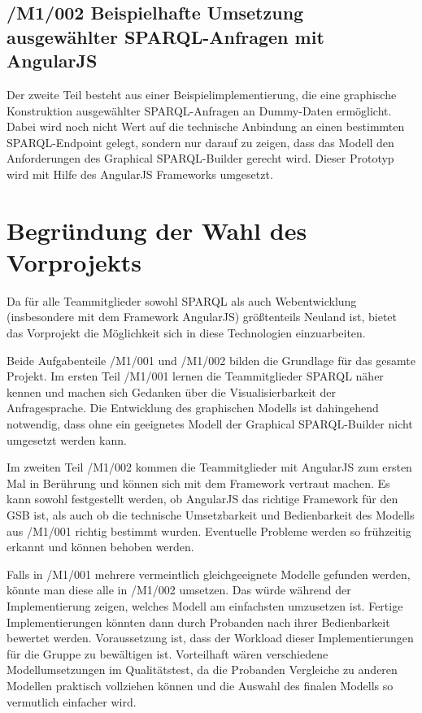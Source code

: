 \subsection*{/M1/002 Beispielhafte Umsetzung ausgewählter SPARQL-Anfragen mit AngularJS}
Der zweite Teil besteht aus einer Beispielimplementierung, die eine graphische Konstruktion ausgewählter SPARQL-Anfragen an Dummy-Daten ermöglicht.
Dabei wird noch nicht Wert auf die technische Anbindung an einen bestimmten SPARQL-Endpoint gelegt, sondern nur darauf zu zeigen, dass das Modell den Anforderungen des Graphical SPARQL-Builder gerecht wird.
Dieser Prototyp wird mit Hilfe des AngularJS Frameworks umgesetzt. 


\section{Begründung der Wahl des Vorprojekts}

Da für alle Teammitglieder sowohl SPARQL als auch Webentwicklung (insbesondere mit dem Framework AngularJS) größtenteils Neuland ist, bietet das Vorprojekt die Möglichkeit sich in diese Technologien einzuarbeiten.

Beide Aufgabenteile /M1/001 und /M1/002 bilden die Grundlage für das gesamte Projekt.
Im ersten Teil /M1/001 lernen die Teammitglieder SPARQL näher kennen und machen sich Gedanken über die Visualisierbarkeit der Anfragesprache. Die Entwicklung des graphischen Modells ist dahingehend notwendig, dass ohne ein geeignetes Modell der Graphical SPARQL-Builder nicht umgesetzt werden kann.

Im zweiten Teil /M1/002 kommen die Teammitglieder mit AngularJS zum ersten Mal in Berührung und können sich mit dem Framework vertraut machen.
Es kann sowohl festgestellt werden, ob AngularJS das richtige Framework für den GSB ist, als auch ob die technische Umsetzbarkeit und Bedienbarkeit des Modells aus /M1/001 richtig bestimmt wurden.
Eventuelle Probleme werden so frühzeitig erkannt und können behoben werden.

Falls in /M1/001 mehrere vermeintlich gleichgeeignete Modelle gefunden werden, könnte man diese alle in /M1/002 umsetzen. Das würde während der Implementierung zeigen, welches Modell am einfachsten umzusetzen ist. Fertige Implementierungen könnten dann durch Probanden nach ihrer Bedienbarkeit bewertet werden. Voraussetzung ist, dass der Workload dieser Implementierungen für die Gruppe zu bewältigen ist. Vorteilhaft wären verschiedene Modellumsetzungen im Qualitätstest, da die Probanden Vergleiche zu anderen Modellen praktisch vollziehen können und die Auswahl des finalen Modells so vermutlich einfacher wird.

